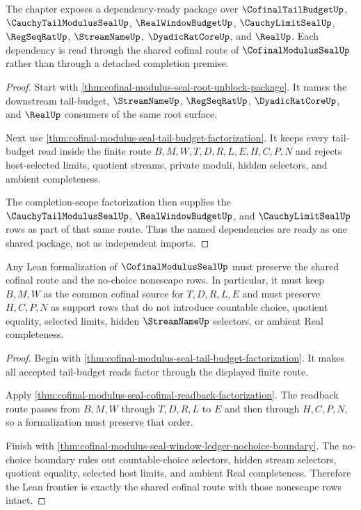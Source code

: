 \begin{theorem}
\label{thm:cofinal-modulus-seal-deps-ready-package}
The chapter exposes a dependency-ready package over $\CofinalTailBudgetUp$, $\CauchyTailModulusSealUp$, $\RealWindowBudgetUp$, $\CauchyLimitSealUp$, $\RegSeqRatUp$, $\StreamNameUp$, $\DyadicRatCoreUp$, and $\RealUp$. Each dependency is read through the shared cofinal route of $\CofinalModulusSealUp$ rather than through a detached completion premise.
\end{theorem}
\begin{proof}
Start with \autoref{thm:cofinal-modulus-seal-root-unblock-package}. It names the downstream tail-budget, $\StreamNameUp$, $\RegSeqRatUp$, $\DyadicRatCoreUp$, and $\RealUp$ consumers of the same root surface.

Next use \autoref{thm:cofinal-modulus-seal-tail-budget-factorization}. It keeps every tail-budget read inside the finite route $B,M,W,T,D,R,L,E,H,C,P,N$ and rejects host-selected limits, quotient streams, private moduli, hidden selectors, and ambient completeness.

The completion-scope factorization then supplies the $\CauchyTailModulusSealUp$, $\RealWindowBudgetUp$, and $\CauchyLimitSealUp$ rows as part of that same route. Thus the named dependencies are ready as one shared package, not as independent imports.
\end{proof}

\begin{theorem}
\label{thm:cofinal-modulus-seal-lean-frontier-readiness}
Any Lean formalization of $\CofinalModulusSealUp$ must preserve the shared cofinal route and the no-choice nonescape rows. In particular, it must keep $B,M,W$ as the common cofinal source for $T,D,R,L,E$ and must preserve $H,C,P,N$ as support rows that do not introduce countable choice, quotient equality, selected limits, hidden $\StreamNameUp$ selectors, or ambient Real completeness.
\end{theorem}
\begin{proof}
Begin with \autoref{thm:cofinal-modulus-seal-tail-budget-factorization}. It makes all accepted tail-budget reads factor through the displayed finite route.

Apply \autoref{thm:cofinal-modulus-seal-cofinal-readback-factorization}. The readback route passes from $B,M,W$ through $T,D,R,L$ to $E$ and then through $H,C,P,N$, so a formalization must preserve that order.

Finish with \autoref{thm:cofinal-modulus-seal-window-ledger-nochoice-boundary}. The no-choice boundary rules out countable-choice selectors, hidden stream selectors, quotient equality, selected host limits, and ambient Real completeness. Therefore the Lean frontier is exactly the shared cofinal route with those nonescape rows intact.
\end{proof}

